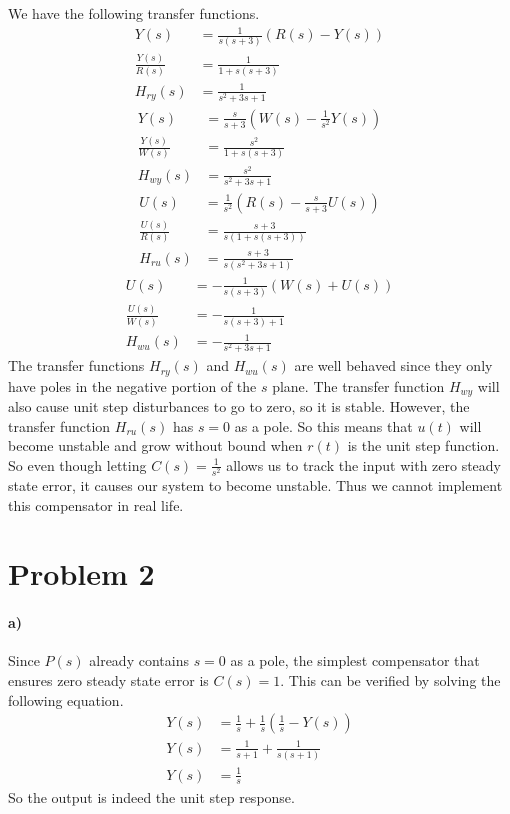 \documentclass[12pt]{article}
\begin{document}
We have the following transfer functions.
\begin{align*}
    Y(s)&=\frac{1}{s(s+3)}(R(s)-Y(s))\\
    \frac{Y(s)}{R(s)}&=\frac{1}{1+s(s+3)}\\
    H_{ry}(s)&=\frac{1}{s^2+3s+1}
\end{align*}
\begin{align*}
    Y(s)&=\frac{s}{s+3}\left(W(s)-\frac{1}{s^2}Y(s)\right)\\
    \frac{Y(s)}{W(s)}&=\frac{s^2}{1+s(s+3)}\\
    H_{wy}(s)&=\frac{s^2}{s^2+3s+1}
\end{align*}
\begin{align*}
    U(s)&=\frac{1}{s^2}\left(R(s)-\frac{s}{s+3}U(s)\right)\\
    \frac{U(s)}{R(s)}&=\frac{s+3}{s(1+s(s+3))}\\
    H_{ru}(s)&=\frac{s+3}{s(s^2+3s+1)}
\end{align*}
\begin{align*}
    U(s)&=-\frac{1}{s(s+3)}(W(s)+U(s))\\
    \frac{U(s)}{W(s)}&=-\frac{1}{s(s+3)+1}\\
    H_{wu}(s)&=-\frac{1}{s^2+3s+1}
\end{align*}
The transfer functions \(H_{ry}(s)\) and \(H_{wu}(s)\) are well behaved since they only have poles in the negative portion of the
\(s\) plane. The transfer function \(H_{wy}\) will also cause unit step disturbances to go to zero, so it is stable. However,
the transfer function \(H_{ru}(s)\) has \(s=0\) as a pole. So this means that \(u(t)\) will become unstable and grow without bound
when \(r(t)\) is the unit step function. So even though letting \(C(s)=\frac{1}{s^2}\) allows us to track the input with zero
steady state error, it causes our system to become unstable. Thus we cannot implement this compensator in real life.

\section*{Problem 2}

\paragraph{a)}

Since \(P(s)\) already contains \(s=0\) as a pole, the simplest compensator that ensures zero steady state error is \(C(s)=1\).
This can be verified by solving the following equation.
\begin{align*}
    Y(s)&=\frac{1}{s} + \frac{1}{s}\left(\frac{1}{s}-Y(s)\right)\\
    Y(s)&=\frac{1}{s+1}+\frac{1}{s(s+1)}\\
    Y(s)&=\frac{1}{s}
\end{align*}
So the output is indeed the unit step response.
\end{document}
